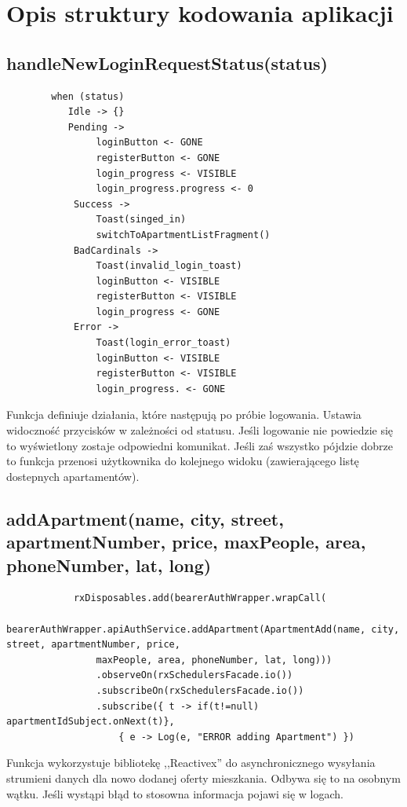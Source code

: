 \documentclass[polish, 11pt]{article}
\begin{document}
\section{Opis struktury kodowania aplikacji} %
    \subsection{handleNewLoginRequestStatus(status)}
        \begin{lstlisting}
        when (status) 
           Idle -> {}
           Pending -> 
                loginButton <- GONE
                registerButton <- GONE
                login_progress <- VISIBLE
                login_progress.progress <- 0
            Success -> 
                Toast(singed_in)
                switchToApartmentListFragment()
            BadCardinals -> 
                Toast(invalid_login_toast)
                loginButton <- VISIBLE
                registerButton <- VISIBLE
                login_progress <- GONE
            Error -> 
                Toast(login_error_toast)
                loginButton <- VISIBLE
                registerButton <- VISIBLE
                login_progress. <- GONE
         \end{lstlisting}
         Funkcja definiuje działania, które następują po próbie logowania. Ustawia widoczność przycisków w zależności od statusu. Jeśli logowanie nie powiedzie się to wyświetlony zostaje odpowiedni komunikat. Jeśli zaś wszystko pójdzie dobrze to funkcja przenosi użytkownika do kolejnego widoku (zawierającego listę dostepnych apartamentów).
    \subsection{addApartment(name, city, street, apartmentNumber, price, maxPeople, area, phoneNumber, lat, long)}
        \begin{lstlisting}
            rxDisposables.add(bearerAuthWrapper.wrapCall(
            bearerAuthWrapper.apiAuthService.addApartment(ApartmentAdd(name, city, street, apartmentNumber, price,
                maxPeople, area, phoneNumber, lat, long)))
                .observeOn(rxSchedulersFacade.io())
                .subscribeOn(rxSchedulersFacade.io())
                .subscribe({ t -> if(t!=null) apartmentIdSubject.onNext(t)},
                    { e -> Log(e, "ERROR adding Apartment") })
        \end{lstlisting}
        Funkcja wykorzystuje bibliotekę ,,Reactivex'' do asynchronicznego wysyłania strumieni danych dla nowo dodanej oferty mieszkania. Odbywa się to na osobnym wątku. Jeśli wystąpi błąd to stosowna informacja pojawi się w logach.
\end{document}
